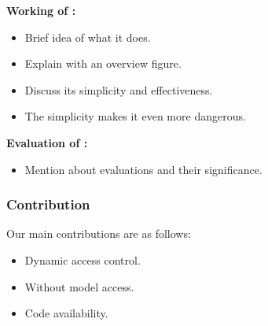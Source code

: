 \noindent \textbf{Working of \methodname:}
\begin{itemize}
    \item Brief idea of what it does.
    \item Explain with an overview figure.
    \item Discuss its simplicity and effectiveness.
    \item The simplicity makes it even more dangerous.
\end{itemize}


\noindent \textbf{Evaluation of \methodname:}
\begin{itemize}
    \item Mention about evaluations and their significance.
\end{itemize}

\subsubsection*{Contribution}
Our main contributions are as follows:
\begin{itemize}
    \item Dynamic access control.
    \item Without model access.
    \item Code availability.
\end{itemize}


